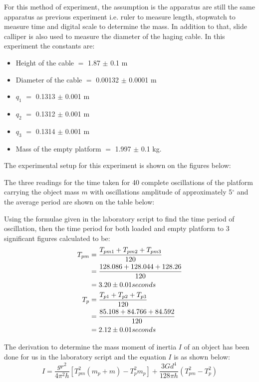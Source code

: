 For this method of experiment, the assumption is the apparatus are still the same apparatus as previous experiment i.e. ruler to measure length, stopwatch to measure time and digital scale to determine the mass. In addition to that, slide calliper is also used to measure the diameter of the haging cable. In this experiment the constants are:
\begin{itemize}
\item Height of the cable $=$ 1.87 $\pm$ 0.1 m
\item Diameter of the cable $=$ 0.00132 $\pm$ 0.0001 m
\item $q_1$ $=$ 0.1313 $\pm$ 0.001 m
\item $q_2$ $=$ 0.1312 $\pm$ 0.001 m
\item $q_3$ $=$ 0.1314 $\pm$ 0.001 m
\item Mass of the empty platform $=$ 1.997 $\pm$ 0.1 kg.
\end{itemize}
The experimental setup for this experiment is shown on the figures below:



The three readings for the time taken for 40 complete oscillations of the platform carrying the object mass $m$ with oscillations amplitude of approximately 5$^\circ$ and the average period are shown on the table below:


Using the formulae given in the laboratory script to find the time period of oscillation, then the time period for both loaded and empty platform to 3 significant figures calculated to be:
\begin{align}
T_{pm} &= \frac{T_{pm1} + T_{pm2} + T_{pm3}}{120} \notag \\
&= \frac{128.086 + 128.044 + 128.26}{120} \notag \\
&= 3.20 \pm 0.01 seconds \notag \\
T_p  &= \frac{T_{p1} + T_{p2} + T_{p3}}{120} \notag \\
&= \frac{85.108 + 84.766 + 84.592}{120} \notag \\
&= 2.12  \pm 0.01 seconds\notag
\end{align}

The derivation to determine the mass moment of inertia $I$ of an object has been done for us in the laboratory script and the equation $I$ is as shown below:
\begin{equation}
I = \frac{gr^2}{4\pi^2h}\left[T_{pm}^2\left(m_p + m\right) - T_p^2m_p\right] + \frac{3Gd^4}{128\pi h}\left(T_{pm}^2-T_p^2\right)
\end{equation}

